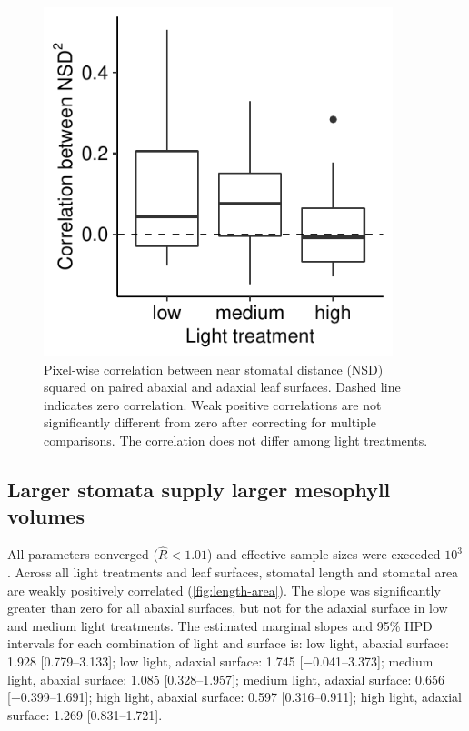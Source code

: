 \documentclass[webpdf,large,modern,unnumsec,namedate]{oup-authoring-template}
\begin{document}
\begin{figure}[ht]
\includegraphics[width = 4in]{figures/dual-surface.pdf}
\caption{Pixel-wise correlation between near stomatal distance (NSD) squared on paired abaxial and adaxial leaf surfaces. Dashed line indicates zero correlation. Weak positive correlations are not significantly different from zero after correcting for multiple comparisons. The correlation does not differ among light treatments.}
\label{fig:dual-surface}
\end{figure}

\hypertarget{larger-stomata-supply-larger-mesophyll-volumes}{%
\subsection{Larger stomata supply larger mesophyll
volumes}\label{larger-stomata-supply-larger-mesophyll-volumes}}

All parameters converged (\(\hat{R} < 1.01\)) and effective sample sizes
were exceeded \(10^3\). Across all light treatments and leaf surfaces,
stomatal length and stomatal area are weakly positively correlated
(\autoref{fig:length-area}). The slope was significantly greater than
zero for all abaxial surfaces, but not for the adaxial surface in low
and medium light treatments. The estimated marginal slopes and 95\% HPD
intervals for each combination of light and surface is: low light,
abaxial surface: 1.928 {[}\numrange{0.779}{3.133}{]}; low light, adaxial
surface: 1.745 {[}\numrange{-0.041}{3.373}{]}; medium light, abaxial
surface: 1.085 {[}\numrange{0.328}{1.957}{]}; medium light, adaxial
surface: 0.656 {[}\numrange{-0.399}{1.691}{]}; high light, abaxial
surface: 0.597 {[}\numrange{0.316}{0.911}{]}; high light, adaxial
surface: 1.269 {[}\numrange{0.831}{1.721}{]}.
\end{document}
